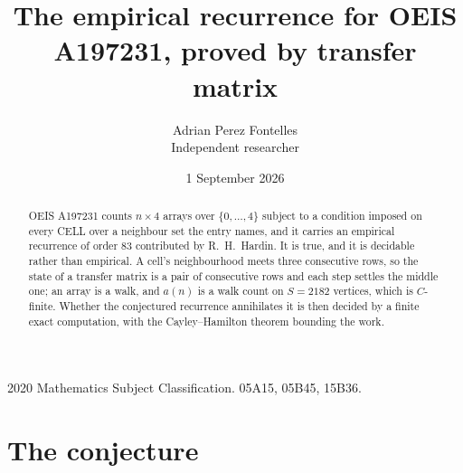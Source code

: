 \documentclass[11pt,a4paper]{article}
\title{The empirical recurrence for OEIS A197231, proved by transfer matrix}
\author{Adrian Perez Fontelles\\ \small Independent researcher}
\date{1 September 2026}
\theoremstyle{plain}
\theoremstyle{definition}
\begin{document}
\maketitle

\begin{abstract}
OEIS A197231 counts $n\times4$ arrays over $\{0,\dots,4\}$ subject to a condition imposed on
every CELL over a neighbour set the entry names, and it carries an empirical recurrence of
order $83$ contributed by R.~H.~Hardin. It is true, and it is decidable rather than
empirical. A cell's neighbourhood meets three consecutive rows, so the state of a transfer
matrix is a pair of consecutive rows and each step settles the middle one; an array is a
walk, and $a(n)$ is a walk count on $S=2182$ vertices, which is $C$-finite. Whether the
conjectured recurrence annihilates it is then decided by a finite exact computation, with the
Cayley--Hamilton theorem bounding the work.
\end{abstract}

\noindent\small 2020 Mathematics Subject Classification. 05A15, 05B45, 15B36.\normalsize

\section{The conjecture}
\end{document}

